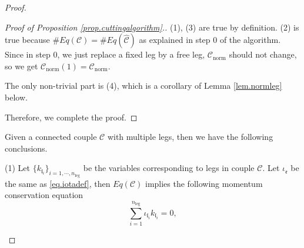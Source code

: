 \begin{proof}
\begin{proof}[Proof of Proposition \ref{prop.cuttingalgorithm}.]

(1), (3) are true by definition. (2) is true because
$\#Eq(\mathcal{C})=\#Eq(\widehat{\mathcal{C}})$ as explained in step $0$ of the algorithm. Since in step $0$, we just replace a fixed leg by a free leg, $\mathcal{C}_{\text{norm}}$ should not change, so we get $\mathcal{C}_{\text{norm}}(1)=\mathcal{C}_{\text{norm}}$. 

The only non-trivial part is (4), which is a corollary of Lemma \ref{lem.normleg} below.

Therefore, we complete the proof.
\end{proof}


\begin{lem}\label{lem.freeleg} %
Given a connected couple $\mathcal{C}$ with multiple legs, then we have the following conclusions.

(1) Let $\{k_{\mathfrak{l}_i}\}_{i=1,\cdots,n_{\text{leg}}}$ be the variables corresponding to legs in couple $\mathcal{C}$. Let $\iota_{\mathfrak{e}}$ be the same as \eqref{eq.iotadef}, then $Eq(\mathcal{C})$ implies the following momentum conservation equation
\begin{equation}\label{eq.momentumconservation}
    \sum_{i=1}^{n_{\text{leg}}} \iota_{\mathfrak{l}_i}k_{\mathfrak{l}_i}=0,
\end{equation}


\end{lem}
\end{proof}
